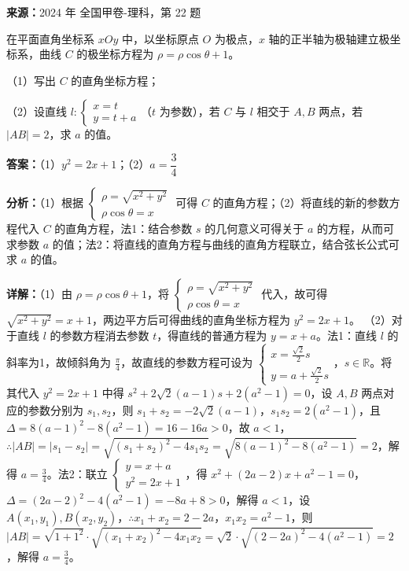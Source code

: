\begin{question}[points=10]
\textbf{来源：}2024 年 全国甲卷-理科，第 22 题\par
[选修4-4：坐标系与参数方程]

在平面直角坐标系 $xOy$ 中，以坐标原点 $O$ 为极点，$x$ 轴的正半轴为极轴建立极坐标系，曲线 $C$ 的极坐标方程为 $\rho=\rho\cos\theta+1$。

（1）写出 $C$ 的直角坐标方程；

（2）设直线 $l:\begin{cases} x=t \\ y=t+a \end{cases}$（$t$ 为参数），若 $C$ 与 $l$ 相交于 $A,B$ 两点，若 $|AB|=2$，求 $a$ 的值。
\begin{solution}
\textbf{答案：}（1）$y^2=2x+1$；（2）$a=\dfrac{3}{4}$

\textbf{分析：}（1）根据 $\begin{cases} \rho=\sqrt{x^2+y^2} \\ \rho\cos\theta=x \end{cases}$ 可得 $C$ 的直角方程；（2）将直线的新的参数方程代入 $C$ 的直角方程，法1：结合参数 $s$ 的几何意义可得关于 $a$ 的方程，从而可求参数 $a$ 的值；法2：将直线的直角方程与曲线的直角方程联立，结合弦长公式可求 $a$ 的值。

\textbf{详解：}（1）由 $\rho=\rho\cos\theta+1$，将 $\begin{cases} \rho=\sqrt{x^2+y^2} \\ \rho\cos\theta=x \end{cases}$ 代入，故可得 $\sqrt{x^2+y^2}=x+1$，两边平方后可得曲线的直角坐标方程为 $y^2=2x+1$。
（2）对于直线 $l$ 的参数方程消去参数 $t$，得直线的普通方程为 $y=x+a$。法1：直线 $l$ 的斜率为1，故倾斜角为 $\frac{\pi}{4}$，故直线的参数方程可设为 $\begin{cases} x=\frac{\sqrt{2}}{2}s \\ y=a+\frac{\sqrt{2}}{2}s \end{cases}$，$s\in\mathbb{R}$。将其代入 $y^2=2x+1$ 中得 $s^2+2\sqrt{2}(a-1)s+2(a^2-1)=0$，设 $A,B$ 两点对应的参数分别为 $s_1,s_2$，则 $s_1+s_2=-2\sqrt{2}(a-1)$，$s_1s_2=2(a^2-1)$，且 $\Delta=8(a-1)^2-8(a^2-1)=16-16a>0$，故 $a<1$，$\therefore |AB|=|s_1-s_2|=\sqrt{(s_1+s_2)^2-4s_1s_2}=\sqrt{8(a-1)^2-8(a^2-1)}=2$，解得 $a=\frac{3}{4}$。法2：联立 $\begin{cases} y=x+a \\ y^2=2x+1 \end{cases}$，得 $x^2+(2a-2)x+a^2-1=0$，$\Delta=(2a-2)^2-4(a^2-1)=-8a+8>0$，解得 $a<1$，设 $A(x_1,y_1),B(x_2,y_2)$，$\therefore x_1+x_2=2-2a$，$x_1x_2=a^2-1$，则 $|AB|=\sqrt{1+1^2}\cdot\sqrt{(x_1+x_2)^2-4x_1x_2}=\sqrt{2}\cdot\sqrt{(2-2a)^2-4(a^2-1)}=2$，解得 $a=\frac{3}{4}$。
\end{solution}
\end{question}

